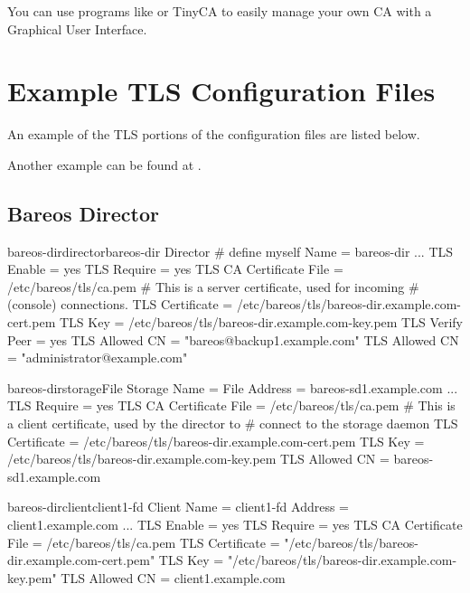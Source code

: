 You can use programs like  or TinyCA
to easily manage your own CA with a Graphical User Interface.



\section{Example TLS Configuration Files}

An example of the TLS portions of the configuration
files are listed below.

Another example can be found at \bareosTlsConfigurationExample.

\subsection{Bareos Director}

\begin{bareosConfigResource}{bareos-dir}{director}{bareos-dir}
Director {                            # define myself
    Name = bareos-dir
    ...
    TLS Enable = yes
    TLS Require = yes
    TLS CA Certificate File = /etc/bareos/tls/ca.pem
    # This is a server certificate, used for incoming
    # (console) connections.
    TLS Certificate = /etc/bareos/tls/bareos-dir.example.com-cert.pem
    TLS Key = /etc/bareos/tls/bareos-dir.example.com-key.pem
    TLS Verify Peer = yes
    TLS Allowed CN = "bareos@backup1.example.com"
    TLS Allowed CN = "administrator@example.com"
}
\end{bareosConfigResource}

\begin{bareosConfigResource}{bareos-dir}{storage}{File}
Storage {
    Name = File
    Address = bareos-sd1.example.com
    ...
    TLS Require = yes
    TLS CA Certificate File = /etc/bareos/tls/ca.pem
    # This is a client certificate, used by the director to
    # connect to the storage daemon
    TLS Certificate = /etc/bareos/tls/bareos-dir.example.com-cert.pem
    TLS Key = /etc/bareos/tls/bareos-dir.example.com-key.pem
    TLS Allowed CN = bareos-sd1.example.com
}
\end{bareosConfigResource}

\begin{bareosConfigResource}{bareos-dir}{client}{client1-fd}
Client {
    Name = client1-fd
    Address = client1.example.com
    ...
    TLS Enable = yes
    TLS Require = yes
    TLS CA Certificate File = /etc/bareos/tls/ca.pem
    TLS Certificate = "/etc/bareos/tls/bareos-dir.example.com-cert.pem"
    TLS Key = "/etc/bareos/tls/bareos-dir.example.com-key.pem"
    TLS Allowed CN = client1.example.com
}
\end{bareosConfigResource}



